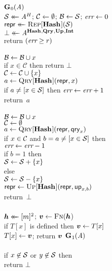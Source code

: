 \begin{figure*}
  {
    \underline{$\mathbf{G}\hspace{0.5pt}_0(\mathit{A})$}\\[2pt]
      $\mathcal{S} \mathrel{\leftarrow\mkern-14mu\leftarrow} \mathit{A}^H$; $\mathcal{C} \gets \emptyset$; $\mathcal{B} \gets \mathcal{S}$; $\textit{err} \gets 0$\\
      $\mathsf{repr} \mathrel{\leftarrow\mkern-14mu\leftarrow} \textsc{Rep}[\mathbf{Hash}\hspace{0.5pt}](\mathcal{S})$\\
      $\bot \mathrel{\leftarrow\mkern-14mu\leftarrow} \mathit{A}^{\mathbf{Hash}\hspace{0.5pt},\mathbf{Qry}\hspace{0.5pt},\mathbf{Up}\hspace{0.5pt},\mathbf{Int}\hspace{0.5pt}}$\\
      return $(\textit{err} \geq r)$
    \\[6pt]
    \\[2pt]
      $\mathcal{B} \gets \mathcal{B} \cup x$\\
      if $x \in \mathcal{C}$ then return $\bot$\\
      $\mathcal{C} \gets \mathcal{C} \cup \{x\}$\\
      $a \gets \textsc{Qry}[\mathbf{Hash}\hspace{0.5pt}](\mathsf{repr}, x)$\\
      if $a \neq [x \in \mathcal{S}]$ then $\textit{err} \gets \textit{err} + 1$\\
      return~$a$
    \\[6pt]
    \\[2pt]
      $\mathcal{B} \gets \mathcal{B} \cup x$\\
      $\mathcal{C} \gets \emptyset$\\
      $a \gets \textsc{Qry}[\mathbf{Hash}\hspace{0.5pt}](\mathsf{repr}, \mathsf{qry}_x)$\\
      if $x \in \mathcal{C}$ and $b = a \neq [x \in \mathcal{S}]$ then\\
      \tab $\textit{err} \gets \textit{err}-1$\\
      if $b = 1$ then\\
      \tab $\mathcal{S} \gets \mathcal{S} + \{x\}$\\
      else\\
      \tab $\mathcal{S} \gets \mathcal{S} - \{x\}$\\
      $\mathsf{repr} \gets \textsc{Up}[\mathbf{Hash}\hspace{0.5pt}](\mathsf{repr},\mathsf{up}_{x,b})$\\
      return~$\bot$
    \\[6pt]
    \\
      $\hh \getsr [m]^2$; $\vv \gets \fff(\hh$)\\
      if $T[x]$ is defined then $\vv \gets T[x]$\\
      $T[x] \gets \vv$;
      return $\vv$
  }
  {
    \underline{$\mathbf{G}\hspace{0.5pt}_1(\mathit{A})$}\\[2pt]
    \\
      if $x \not\in \mathcal{S}$ or $y \not\in \mathcal{S}$ then\\
      \tab return $\bot$\\
}
\end{figure*}

